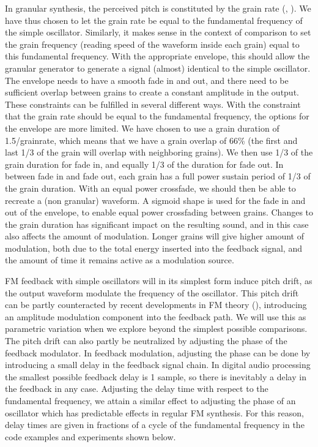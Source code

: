 \documentclass[runningheads,a4paper]{llncs}
\begin{document}
In granular synthesis, the perceived pitch is constituted by the grain rate (\cite{Roads-2001}, \cite{Brandtsegg-particle}). We have thus chosen to let the grain rate be equal to the fundamental frequency of the simple oscillator. Similarly, it makes sense in the context of comparison to set the grain frequency (reading speed of the waveform inside each grain) equal to this fundamental frequency. With the appropriate envelope, this should allow the granular generator to generate a signal (almost) identical to the simple oscillator. The envelope needs to have a smooth fade in and out, and there need to be sufficient overlap between grains to create a constant amplitude in the output. These constraints can be fulfilled in several different ways. With the constraint that the grain rate should be equal to the fundamental frequency, the options for the envelope are more limited. We have chosen to use a grain duration of 1.5/grainrate, which means that we have a grain overlap of 66\% (the first and last 1/3 of the grain will overlap with neighboring grains). We then use 1/3 of the grain duration for fade in, and equally 1/3 of the duration for fade out. In between fade in and fade out, each grain has a full power sustain period of 1/3 of the grain duration. With an equal power crossfade, we should then be able to recreate a (non granular) waveform. A sigmoid shape is used for the fade in and out of the envelope, to enable equal power crossfading between grains. Changes to the grain duration has significant impact on the resulting sound, and in this case also affects the amount of modulation. Longer grains will give higher amount of modulation, both due to the total energy inserted into the feedback signal, and the amount of time it remains active as a modulation source.

FM feedback with simple oscillators will in its simplest form induce pitch drift, as the output waveform modulate the frequency of the oscillator. This pitch drift can be partly counteracted by recent developments in FM theory (\cite{Lazzarini-2024}), introducing an amplitude modulation component into the feedback path. We will use this as parametric variation when we explore beyond the simplest possible comparisons. The pitch drift can also partly be neutralized by adjusting the phase of the feedback modulator. In feedback modulation, adjusting the phase can be done by introducing a small delay in the feedback signal chain. In digital audio processing the smallest possible feedback delay is 1 sample, so there is inevitably a delay in the feedback in any case. Adjusting the delay time with respect to the fundamental frequency, we attain a similar effect to adjusting the phase of an oscillator which has predictable effects in regular FM synthesis. For this reason, delay times are given in fractions of a cycle of the fundamental frequency in the code examples and experiments shown below.
\end{document}
